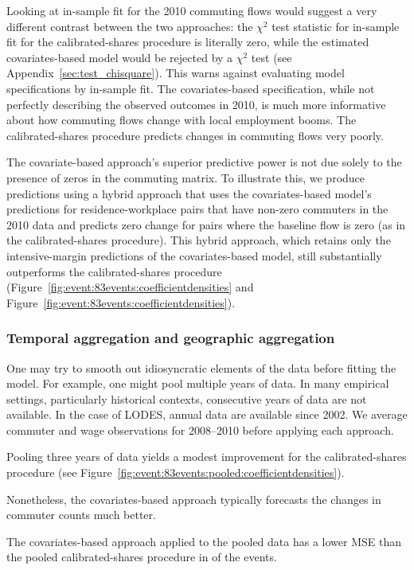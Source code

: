 \documentclass[11pt]{article}
\theoremstyle{definition}
\begin{document}
Looking at in-sample fit for the 2010 commuting flows would suggest a very different contrast between the two approaches:
the $\chi^2$ test statistic for in-sample fit for the calibrated-shares procedure is literally zero,
while the estimated covariates-based model would be rejected by a $\chi^2$ test
(see Appendix~\ref{sec:test_chisquare}).
This warns against evaluating model specifications by in-sample fit.
The covariates-based specification, while not perfectly describing the observed outcomes in 2010,
is much more informative about how commuting flows change with local employment booms.
The calibrated-shares procedure predicts changes in commuting flows very poorly.

The covariate-based approach's superior predictive power is not due solely to the presence of zeros in the commuting matrix.
To illustrate this, we produce predictions using a hybrid approach that
uses the covariates-based model's predictions for residence-workplace pairs that have non-zero commuters in the 2010 data and
predicts zero change for pairs where the baseline flow is zero (as in the calibrated-shares procedure).
This hybrid approach, which retains only the intensive-margin predictions of the covariates-based model,
still substantially outperforms the calibrated-shares procedure
(Figure~\ref{fig:event:83events:coefficientdensities} and Figure~\ref{fig:event:83events:coefficientdensities}).

\subsubsection{Temporal aggregation and geographic aggregation}

One may try to smooth out idiosyncratic elements of the data before fitting the model.
For example,
one might pool multiple years of data.
In many empirical settings, particularly historical contexts, consecutive years of data are not available.
In the case of LODES, annual data are available since 2002.
We average commuter and wage observations for 2008--2010 before applying each approach.

Pooling three years of data yields a modest improvement for the calibrated-shares procedure
(see Figure~\ref{fig:event:83events:pooled:coefficientdensities}).

Nonetheless, the covariates-based approach typically forecasts the changes in commuter counts much better.

The covariates-based approach applied to the pooled data has a lower MSE than the pooled calibrated-shares procedure in  of the  events.
\end{document}
